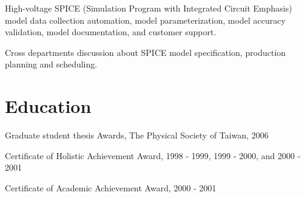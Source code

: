 \documentclass[letterpaper]{deedy-resume-openfont}
\begin{document}
\begin{tightemize}
\item High-voltage SPICE (Simulation Program with Integrated Circuit Emphasis) model data collection automation, model parameterization, model accuracy validation, model documentation, and customer support.
\item Cross departments discussion about SPICE model specification, production planning and scheduling.
\end{tightemize}
\sectionsep


\section{Education} 

\begin{tightemize}
\item \href{https://hdl.handle.net/11244/299774}{\color{link}{Dissertation link}}
\end{tightemize}
\sectionsep

\begin{tightemize}
\item \href{http://www.airitilibrary.com/Publication/alDetailedMesh1?DocID=U0001-1407200616551200}{\color{link}{Thesis link}}
\item Graduate student thesis Awards, The Physical Society of Taiwan, 2006
\end{tightemize}
\sectionsep

\begin{tightemize}
\item Certificate of Holistic Achievement Award, 1998 - 1999, 1999 - 2000, and 2000 - 2001
\item Certificate of Academic Achievement Award, 2000 - 2001
\end{tightemize}
\sectionsep
\end{document}
